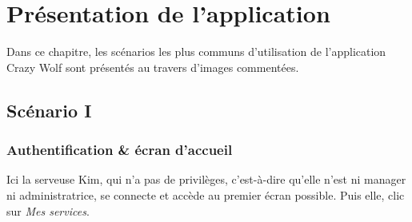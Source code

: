 \chapter[L'application]{Présentation de l'application}

Dans ce chapitre, les scénarios les plus communs
 d'utilisation de l'application Crazy Wolf sont 
 présentés au travers d'images commentées.

\section[Authentification \& écran d'accueil - Scénario I]{Scénario I}
\subsection*{Authentification \& écran d'accueil}
Ici la serveuse Kim, qui n'a pas de privilèges, c'est-à-dire qu'elle n'est 
ni manager ni administratrice, se connecte et accède au premier écran possible.
Puis elle, clic sur \textit{Mes services}.

